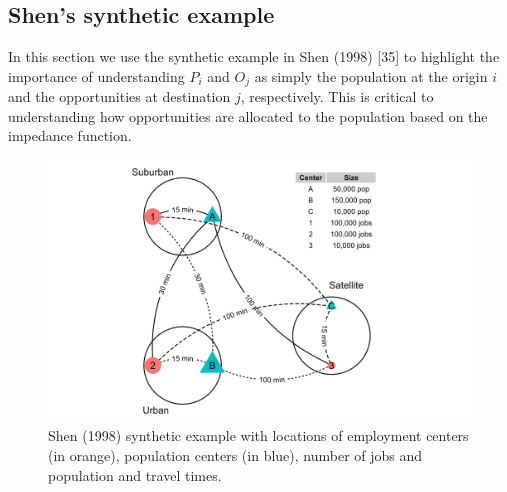 \documentclass[10pt,letterpaper]{article}
\begin{document}
\hypertarget{shens-synthetic-example}{%
\subsection{Shen's synthetic example}\label{shens-synthetic-example}}

In this section we use the synthetic example in Shen (1998) {[}35{]} to
highlight the importance of understanding \(P_i\) and \(O_j\) as simply
the population at the origin \(i\) and the opportunities at destination
\(j\), respectively. This is critical to understanding how opportunities
are allocated to the population based on the impedance function.

\begin{figure}

{\centering \includegraphics[width=1\linewidth]{images/Fig1} 

}

\caption{\label{fig:Fig1} Shen (1998) synthetic example with locations of employment centers (in orange), population centers (in blue), number of jobs and population and travel times.}\label{fig:synthetic-example-plot}
\end{figure}

 
  \providecommand{\huxb}[2]{\arrayrulecolor[RGB]{#1}\global\arrayrulewidth=#2pt}
  \providecommand{\huxvb}[2]{\color[RGB]{#1}\vrule width #2pt}
  \providecommand{\huxtpad}[1]{\rule{0pt}{#1}}
  \providecommand{\huxbpad}[1]{\rule[-#1]{0pt}{#1}}
\end{document}
